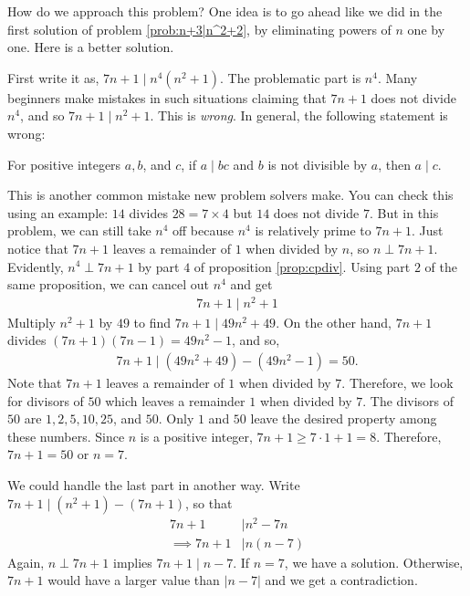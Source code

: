 \documentclass{subfile}
\begin{document}
		\begin{solution}
			How do we approach this problem? One idea is to go ahead like we did in the first solution of problem \eqref{prob:n+3|n^2+2}, by eliminating powers of $n$ one by one. Here is a better solution.

			First write it as, $7n+1 \mid n^4(n^2+1)$. The problematic part is $n^4$. Many beginners make mistakes in such situations claiming that $7n+1$ does not divide $n^4$, and so $7n+1 \mid n^2+1$. This is \textit{wrong}. In general, the following statement is wrong:
			\begin{displayquote}
				For positive integers $a,b$, and $c$, if $a\mid bc$ and $b$ is not divisible by $a$, then $a\mid c$.
			\end{displayquote}
			This is another common  mistake new problem solvers make. You can check this using an example: $14$ divides $28=7\times4$ but $14$ does not divide $7$. But in this problem, we can still take $n^4$ off because $n^4$ is relatively prime to $7n+1$. Just notice that $7n+1$ leaves a remainder of $1$ when divided by $n$, so $n\perp7n+1$. Evidently, $n^4\perp7n+1$ by part $4$ of proposition \eqref{prop:cpdiv}. Using part $2$ of the same proposition, we can cancel out $n^4$ and get
				\begin{align*}
					7n+1  \mid n^2+1
				\end{align*}
			Multiply $n^2+1$ by $49$ to find $ 7n+1 \mid 49n^2+49$. On the other hand, $7n+1$ divides $(7n+1)(7n-1)=49n^2-1$, and so,
				\begin{align*}
					7n+1 \mid (49n^2+49)-(49n^2-1) = 50.
				\end{align*}
			Note that $7n+1$ leaves a remainder of $1$ when divided by $7$. Therefore, we look for divisors of $50$ which leaves a remainder $1$ when divided by $7$. The divisors of $50$ are $1,2,5,10,25$, and $50$. Only $1$ and $50$ leave the desired property among these numbers. Since $n$ is a positive integer, $7n+1\geq7\cdot1+1=8$. Therefore, $7n+1=50$ or $n=7$.
		\end{solution}

		\begin{remark}
			We could handle the last part in another way. Write $7n+1\mid (n^2+1)-(7n+1)$, so that
				\begin{align*}
					7n+1
						& \mid n^2-7n\\
					\implies 7n+1
						& \mid  n(n-7)
				\end{align*}
			Again, $n\perp7n+1$ implies $7n+1\mid n-7$. If $n=7$, we have a solution. Otherwise, $7n+1$ would have a larger value than $|n-7|$ and we get a contradiction.
		\end{remark}
\end{document}
